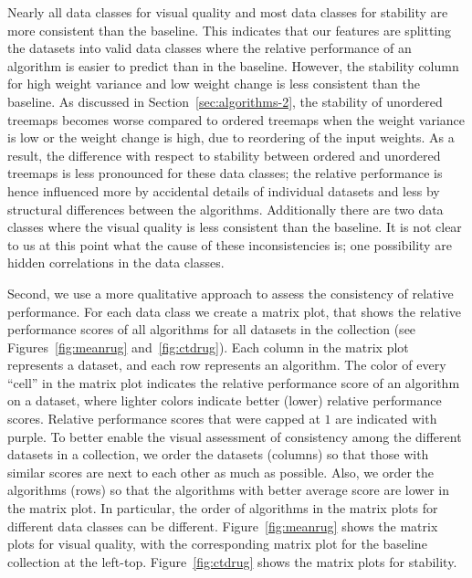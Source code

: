 Nearly all data classes for visual quality and most data classes for stability are more consistent than the baseline. This indicates that our features are splitting the datasets into valid data classes where the relative performance of an algorithm is easier to predict than in the baseline.
However, the stability column for high weight variance and low weight change is less consistent than the baseline. As discussed in Section~\ref{sec:algorithms-2}, the stability of unordered treemaps becomes worse compared to ordered treemaps when the weight variance is low or the weight change is high, due to reordering of the input weights. As a result, the difference with respect to stability between ordered and unordered treemaps is less pronounced for these data classes; the relative performance is hence influenced more by accidental details of individual datasets and less by structural differences between the algorithms. Additionally there are two data classes where the visual quality is less consistent than the baseline. 
It is not clear to us at this point what the cause of these inconsistencies is; one possibility are hidden correlations in the data classes.

Second, we use a more qualitative approach to assess the consistency of relative performance. For each data class we create a matrix plot, that shows the relative performance scores of all algorithms for all datasets in the collection (see Figures~\ref{fig:meanrug} and~\ref{fig:ctdrug}). Each column in the matrix plot represents a dataset, and each row represents an algorithm. The color of every ``cell'' in the matrix plot indicates the relative performance score of an algorithm on a dataset, where lighter colors indicate better (lower) relative performance scores. Relative performance scores that were capped at $1$ are indicated with purple. To better enable the visual assessment of consistency among the different datasets in a collection, we order the datasets (columns) so that those with similar scores are next to each other as much as possible. Also, we order the algorithms (rows) so that the algorithms with better average score are lower in the matrix plot. In particular, the order of algorithms in the matrix plots for different data classes can be different. Figure~\ref{fig:meanrug} shows the matrix plots for visual quality, with the corresponding matrix plot for the baseline collection at the left-top. Figure~\ref{fig:ctdrug} shows the matrix plots for stability.

